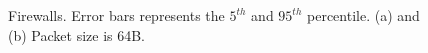 \begin{figure}[t!]
		\centering
	\hspace{1pt}
		
		\caption{Firewalls. Error bars represents the $5^{th}$ and $95^{th}$ percentile. (a) and (b) Packet size is 64B.}
		
		\label{clicknp:fig:firewall}
\end{figure}


